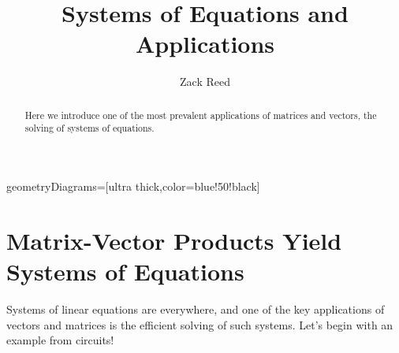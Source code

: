 \documentclass{ximera}
\author{Zack Reed} %
\title{Systems of Equations and Applications}
\begin{document}
\begin{abstract}
Here we introduce one of the most prevalent applications of matrices and vectors, the solving of systems of equations.
\end{abstract}
\maketitle



\tikzstyle geometryDiagrams=[ultra thick,color=blue!50!black]

\section{Matrix-Vector Products Yield Systems of Equations}

Systems of linear equations are everywhere, and one of the key applications of vectors and matrices is the efficient solving of such systems. Let's begin with an example from circuits!
\end{document}
